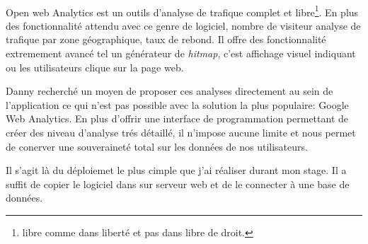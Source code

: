 \documentclass[11pt, a4paper ]{article}
\begin{document}
\begin{spacing}{1.5}



\paragraph{}
Open web Analytics est un outils d'analyse de trafique complet et libre\footnote{libre comme dans liberté et pas dans libre de droit.}. En plus des fonctionnalité attendu avec ce genre de logiciel, nombre de visiteur analyse de trafique par zone géographique, taux de rebond. Il offre des fonctionnalité extremement avancé tel un générateur de \emph{hitmap}, c'est affichage visuel indiquant ou les utilisateurs clique sur la page web.

Danny recherché un moyen de proposer ces analyses directement au sein de l'application ce qui n'est pas possible avec la solution la plus populaire: Google Web Analytics. En plus d'offrir une interface de programmation permettant de créer des niveau d'analyse trés détaillé, il n'impose aucune limite et nous permet de conerver une souveraineté total sur les données de nos utilisateurs.

Il s'agit là du déploiemet le plus cimple que j'ai réaliser durant mon stage. Il a suffit de copier le logiciel dans sur serveur web et de le connecter à une base de données.












\end{spacing}
\end{document}
